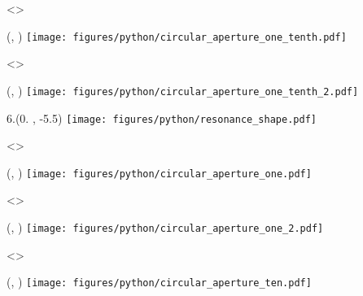 \visible<\SLIDERED>{
    \begin{textblock}{\ANGDISTWIDTH}(\ANGDISTX , \ANGDISTY)
        \texttt{[image: figures/python/circular\_aperture\_one\_tenth.pdf]}
    \end{textblock}
}
\visible<\SLIDEYELLOW>{
    \begin{textblock}{\ANGDISTWIDTH}(\ANGDISTX , \ANGDISTY)
        \texttt{[image: figures/python/circular\_aperture\_one\_tenth\_2.pdf]}
    \end{textblock}
    \begin{textblock}{6.}(0. , -5.5)
        \texttt{[image: figures/python/resonance\_shape.pdf]}
    \end{textblock}    
}
\visible<\SLIDEGREEN>{
    \begin{textblock}{\ANGDISTWIDTH}(\ANGDISTX , \ANGDISTY)
        \texttt{[image: figures/python/circular\_aperture\_one.pdf]}
    \end{textblock}
}
\visible<\SLIDEBLUE>{
    \begin{textblock}{\ANGDISTWIDTH}(\ANGDISTX , \ANGDISTY)
        \texttt{[image: figures/python/circular\_aperture\_one\_2.pdf]}
    \end{textblock}
}
\visible<\SLIDEVIOLET>{
    \begin{textblock}{\ANGDISTWIDTH}(\ANGDISTX , \ANGDISTY)
        \texttt{[image: figures/python/circular\_aperture\_ten.pdf]}
    \end{textblock}
}
